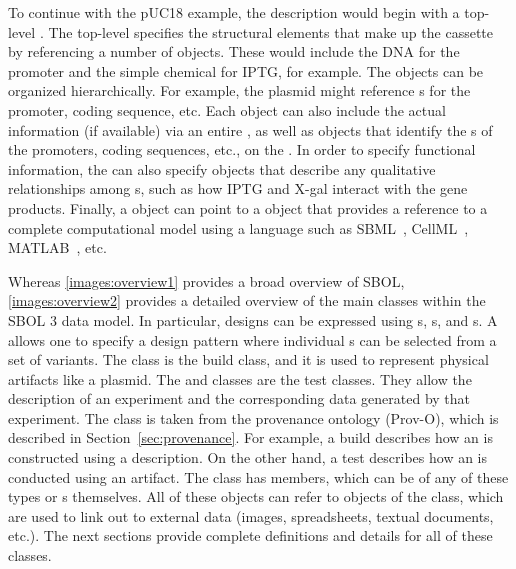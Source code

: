 To continue with the pUC18 example, the description would begin with a top-level .  The top-level  specifies the structural elements that make up the cassette by referencing a number of  objects. These would include the DNA  for the promoter and the simple chemical
 for IPTG, for example.  The  objects can be organized hierarchically.  For example, the plasmid  might reference s for the promoter, coding sequence, etc.  Each  object can also include the actual  information (if available) via an entire  , as well as  objects that identify the s of the promoters, coding sequences, etc., on the .  In order to specify functional information, the  can also specify  objects that describe any qualitative relationships among  s, such as how IPTG and X-gal interact with the gene products.  Finally, a  object can point to a  object that provides a reference to a complete computational model using a language such as SBML~\cite{SBML}, CellML~\cite{CellML}, MATLAB~\cite{matlab}, etc.

Whereas \ref{images:overview1} provides a broad overview of SBOL, \ref{images:overview2} provides a detailed overview of the main classes within the SBOL 3 data model.  In particular, designs can be expressed using s, s, and s.  A  allows one to specify a design pattern where individual s can be selected from a set of variants.  The  class is the build class, and it is used to represent physical artifacts like a plasmid.  The  and  classes are the test classes.  They allow the description of an experiment and the corresponding data generated by that experiment.  The  class is taken from the provenance ontology (Prov-O), which is described in Section~\ref{sec:provenance}.  For example, a build  describes how an  is constructed using a  description.  On the other hand, a test  describes how an  is conducted using an  artifact.  The  class has members, which can be of any of these types or s themselves.  All of these objects can refer to objects of the  class, which are used to link out to external data (images, spreadsheets, textual documents, etc.). 
The next sections provide complete definitions and details for all of these classes.

